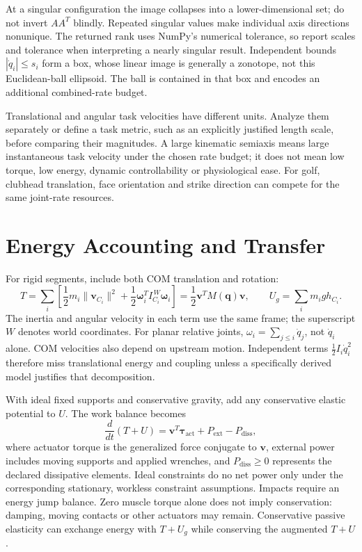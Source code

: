 At a singular configuration the image collapses into a lower-dimensional set;
do not invert $AA^T$ blindly. Repeated singular values make individual axis
directions nonunique. The returned rank uses NumPy's numerical tolerance,
so report scales and tolerance when interpreting a nearly singular result.
Independent bounds $|\dot q_i|\leq s_i$ form a box, whose linear image is
generally a zonotope, not this Euclidean-ball ellipsoid. The ball is contained
in that box and encodes an additional combined-rate budget.

Translational and angular task velocities have different units. Analyze them
separately or define a task metric, such as an explicitly justified length
scale, before comparing their magnitudes. A large kinematic semiaxis means
large instantaneous task velocity under the chosen rate budget; it does not
mean low torque, low energy, dynamic controllability or physiological ease.
For golf, clubhead translation, face orientation and strike direction can
compete for the same joint-rate resources.

\section{Energy Accounting and Transfer}

For rigid segments, include both COM translation and rotation:
\begin{equation}
  T=\sum_i\left[
    \frac12m_i\|\bm{v}_{C_i}\|^2+
    \frac12\bm{\omega}_i^T I_{C_i}^{\,W}\bm{\omega}_i
  \right]=\frac12\bm{v}^TM(\bm{q})\bm{v},
  \qquad U_g=\sum_i m_i g h_{C_i}.
\end{equation}
The inertia and angular velocity in each term use the same frame; the
superscript $W$ denotes world coordinates. For planar relative joints,
$\omega_i=\sum_{j\leq i}\dot q_j$, not $\dot q_i$ alone.
COM velocities also depend on upstream motion. Independent terms
$\tfrac12 I_i\dot q_i^2$ therefore miss translational energy and coupling
unless a specifically derived model justifies that decomposition.

With ideal fixed supports and conservative gravity, add any conservative
elastic potential to $U$. The work balance becomes
\begin{equation}
  \frac{d}{dt}(T+U)
    =\bm{v}^T\bm{\tau}_{\mathrm{act}}
       +P_{\mathrm{ext}}-P_{\mathrm{diss}},
\end{equation}
where actuator torque is the generalized force conjugate to $\bm{v}$,
external power includes moving supports and applied wrenches, and
$P_{\mathrm{diss}}\geq0$ represents the declared dissipative elements.
Ideal constraints do no net power only under the corresponding stationary,
workless constraint assumptions. Impacts require an energy jump balance.
Zero muscle torque alone does not imply conservation: damping, moving
contacts or other actuators may remain. Conservative passive elasticity can
exchange energy with $T+U_g$ while conserving the augmented $T+U$.


